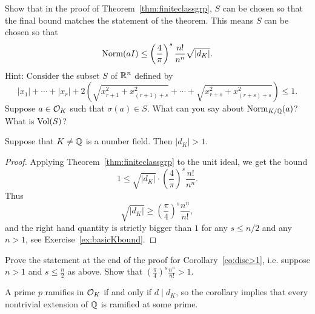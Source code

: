 \begin{exercise}\label{ex:canchooseSright}
Show that in the proof of Theorem~\ref{thm:finiteclassgrp},
$S$ can be chosen so that the final bound matches the statement
of the theorem. This means $S$ can be chosen so that
$$
\operatorname{Norm}(aI) \leq \left(\frac{4}{\pi}\right)^s \frac{n!}{n^n}\sqrt{\left|d_K\right|}.
$$
Hint: Consider the subset $S$ of $\mathbb{R}^n$ defined by
$$
|x_1| + \cdots + |x_r| + 2\left(\sqrt{
x_{r+1}^2+x_{(r+1)+s}^2} + \cdots + \sqrt{
x_{r+s}^2+x_{(r+s)+s}^2}\right) \leq 1.
$$
Suppose $a\in\mathcal{O}_K$ such that $\sigma(a)\in S$. What can you say about $\operatorname{Norm}_{K/\mathbb{Q}}(a)$?
What is $\operatorname{Vol}(S)$?
\end{exercise}

\begin{corollary}\label{co:disc>1}
Suppose that $K\neq \mathbb{Q}$ is a number field.  Then $|d_K|>1$.
\end{corollary}
\begin{proof}
Applying Theorem~\ref{thm:finiteclassgrp} to the unit ideal,
we get the bound
\[
 1\leq \sqrt{|d_K|}\cdot \left(\frac{4}{\pi}\right)^s\frac{n!}{n^n}.
\]
Thus
\[
 \sqrt{|d_K|}
  \geq
\left(\frac{\pi}{4}\right)^s\frac{n^n}{n!},
\]
and the right hand quantity is strictly bigger than $1$ for
any $s\leq n/2$ and any $n>1$, see Exercise~\ref{ex:basicKbound}.
\end{proof}

\begin{exercise}\label{ex:basicKbound}
Prove the statement at the end of the proof for Corollary~\ref{co:disc>1}, i.e. suppose $n>1$ and $s\leq \frac{n}{2}$ as above. Show that
$
\left(\frac{\pi}{4}\right)^s\frac{n^n}{n!} > 1.
$
\end{exercise}

A prime $p$ ramifies in $\mathcal{O}_K$ if and only if $d\mid d_K$,
so the corollary implies that every nontrivial extension of $\mathbb{Q}$
is ramified at some prime.


